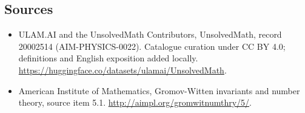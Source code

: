 \documentclass[11pt]{article}
\begin{document}
\subsection{Sources}
\begin{itemize}
\item[\hypertarget{source:20002514:1}{S1}] ULAM.AI and the UnsolvedMath Contributors, UnsolvedMath, record 20002514 (AIM-PHYSICS-0022). Catalogue curation under CC BY 4.0; definitions and English exposition added locally.
\url{https://huggingface.co/datasets/ulamai/UnsolvedMath}.
\item[\hypertarget{source:20002514:2}{S2}] American Institute of Mathematics, Gromov-Witten invariants and number theory, source item 5.1.
\url{http://aimpl.org/gromwitnumthry/5/}.
\end{itemize}
\label{end:20002514}
\end{document}
